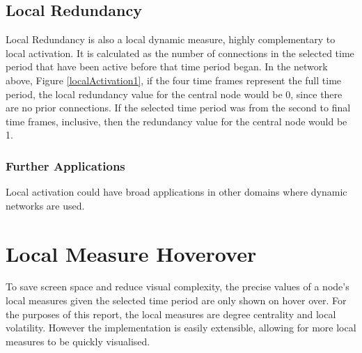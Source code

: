 
\subsection{Local Redundancy}

Local Redundancy is also a local dynamic measure, highly complementary to local activation. It is calculated as the number of connections in the selected time period that have been active before that time period began. In the network above, Figure \ref{localActivation1}, if the four time frames represent the full time period, the local redundancy value for the central node would be 0, since there are no prior connections. If the selected time period was from the second to final time frames, inclusive, then the redundancy value for the central node would be 1.

\subsubsection{Further Applications}
Local activation could have broad applications in other domains where dynamic networks are used. 
\newline\newline

\section{Local Measure Hoverover}
\label{sec:localMeasureVis}
To save screen space and reduce visual complexity, the precise values of a node's local measures given the selected time period are only shown on hover over. For the purposes of this report, the local measures are degree centrality and local volatility. However the implementation is easily extensible, allowing for more local measures to be quickly visualised.

